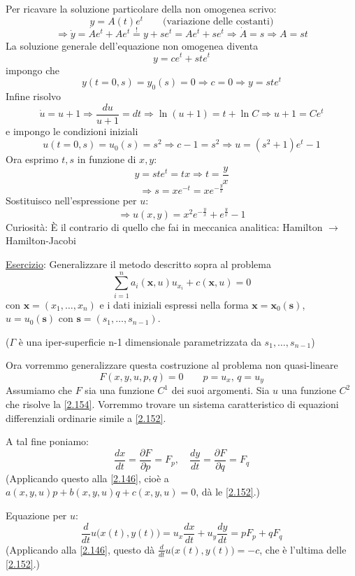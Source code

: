 \documentclass[a4paper,11pt]{report}
\newcommand{\vect}[1]{\boldsymbol{#1}}
\newcommand{\x}{\boldsymbol{x}}
\begin{document}
Per ricavare la soluzione particolare della non omogenea scrivo:
 \[
 y=A(t)e^t \qquad \text{(variazione delle costanti)}
 \]
 \[
 \Rightarrow \dot{y}=\dot{A}e^t + Ae^t \overset{!}{=} y+se^t = Ae^t + se^t \Rightarrow \dot{A}=s \Rightarrow A=st
 \]
La soluzione generale dell'equazione non omogenea diventa 
\[
y=ce^t + st e^t
\]
impongo che 
\[
y(t=0,s)=y_0(s)=0 \Rightarrow c=0 \Rightarrow y=ste^t
\]
Infine risolvo
\[
\dot{u}=u+1\Rightarrow \frac{du}{u+1}=dt \Rightarrow \ln(u+1)=t+\ln C \Rightarrow u+1 = Ce^t
\]
e impongo le condizioni iniziali 
\[
u(t=0,s)=u_0(s)=s^2 \Rightarrow c-1=s^2 \Rightarrow u=(s^2 + 1)e^t -1
\]
Ora esprimo $t,s$ in funzione di $x,y$: 
\[
y=ste^t =tx \Rightarrow t=\frac{y}{x}
\]
\[
\Rightarrow s=xe^{-t}=xe^{-\frac{y}{x}}
\]
Sostituisco nell'espressione per $u$:
\[
\Rightarrow u(x,y)=x^2e^{-\frac{y}{x}}+e^{\frac{y}{x}}-1
\]
Curiosit\`a: \`E il contrario di quello che fai in meccanica analitica: Hamilton $\rightarrow$ Hamilton-Jacobi

\medskip

\underline{Esercizio}: Generalizzare il metodo descritto sopra al problema
\[
\sum_{i=1}^n a_i(\x,u)u_{x_i} + c(\x,u)=0
\]
con $\x = (x_1,\ldots,x_n)$ e i dati iniziali espressi nella forma $\x=\x_0(\vect{s})$, $u=u_0(\vect{s})$ con $\vect{s}=(s_1,\ldots,s_{n-1})$. 

($\Gamma$ \`e una iper-superficie n-1 dimensionale parametrizzata da $s_1,\ldots,s_{n-1}$)

\medskip

Ora vorremmo generalizzare questa costruzione al problema non quasi-lineare
\begin{equation}
F(x,y,u,p,q)=0 \qquad p=u_x,\, q=u_y
\label{2.154}
\end{equation}
Assumiamo che $F$ sia una funzione $C^1$ dei suoi argomenti.
Sia $u$ una funzione $C^2$ che risolve la \eqref{2.154}.
Vorremmo trovare un sistema caratteristico di equazioni differenziali ordinarie simile a \eqref{2.152}.

A tal fine poniamo:
\begin{equation}
\frac{dx}{dt}=\frac{\partial F}{\partial p}=F_p, \quad \frac{dy}{dt}=\frac{\partial F}{\partial q}=F_q
\label{2.155}
\end{equation}
(Applicando questo alla \eqref{2.146}, cio\`e a $a(x,y,u)p + b(x,y,u)q + c(x,y,u)=0$, d\`a le \eqref{2.152}.)

Equazione per $u$:
\begin{equation}
\frac{d}{dt}u\big(x(t),y(t)\big) = u_x \frac{dx}{dt}+u_y\frac{dy}{dt}=p F_p + q F_q 
\label{2.156}
\end{equation}
(Applicando alla \eqref{2.146}, questo d\`a $\frac{d}{dt}u\big(x(t),y(t)\big)=-c$, che \`e l'ultima delle \eqref{2.152}.)
\end{document}
